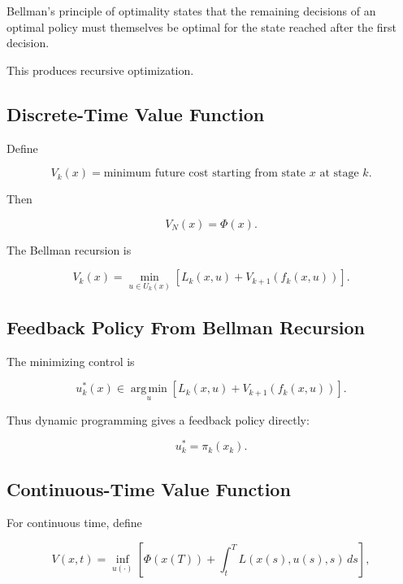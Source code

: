 Bellman's principle of optimality states that the remaining decisions of an
optimal policy must themselves be optimal for the state reached after the
first decision.

This produces recursive optimization.

\subsection{Discrete-Time Value Function}
\label{subsec:discrete-value-function}

Define

\[
\boxed{
V_k(x)
=
\text{minimum future cost starting from state }x\text{ at stage }k.
}
\]

Then

\[
\boxed{
V_N(x)
=
\Phi(x).
}
\]

The Bellman recursion is

\[
\boxed{
V_k(x)
=
\min_{u\in U_k(x)}
\left[
L_k(x,u)
+
V_{k+1}
(
f_k(x,u)
)
\right].
}
\]

\subsection{Feedback Policy From Bellman Recursion}
\label{subsec:feedback-from-bellman}

The minimizing control is

\[
\boxed{
u_k^*(x)
\in
\operatorname*{arg\,min}_{u}
\left[
L_k(x,u)
+
V_{k+1}
(
f_k(x,u)
)
\right].
}
\]

Thus dynamic programming gives a feedback policy directly:

\[
\boxed{
u_k^*
=
\pi_k(x_k).
}
\]

\subsection{Continuous-Time Value Function}
\label{subsec:continuous-value-function}

For continuous time, define

\[
\boxed{
V(x,t)
=
\inf_{u(\cdot)}
\left[
\Phi(x(T))
+
\int_t^T
L
(
x(s),
u(s),
s
)
\,ds
\right],
}
\]

